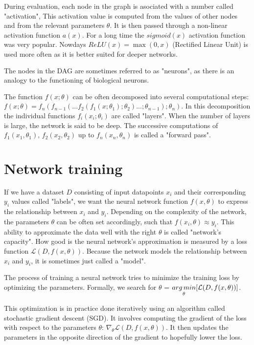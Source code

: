 During evaluation, each node in the graph is asociated with a number called "activation", This activation value is computed from the values of other nodes and from the relevant parameters $\theta$. It is then passed through a non-linear activation function $a(x)$. For a long time the $sigmoid(x)$ activation function was very popular. Nowdays $ReLU(x) = \max(0, x)$ (Rectified Linear Unit) is used more often as it is better suited for deeper networks.

The nodes in the DAG are sometimes referred to as "neurons", as there is an analogy to the functioning of biological neurons.

The function $f(x;\theta)$ can be often decomposed into several computational steps: $f(x;\theta) = f_n(f_{n-1}(...f_2(f_1(x; \theta_1);\theta_2)...;\theta_{n-1});\theta_n)$. In this decomposition the individual functions $f_i(x_i; \theta_i)$ are called "layers". When the number of layers is large, the network is said to be deep. The successive computations of $f_1(x_1, \theta_1)$, $f_2(x_2, \theta_2)$ up to $f_n(x_n, \theta_n)$ is called a "forward pass".

\section{Network training}
If we have a dataset $D$ consisting of input datapoints $x_i$ and their corresponding $y_i$ values called "labels", we want the neural network function $f(x, \theta)$ to express the relationship between $x_i$ and $y_i$. Depending on the complexity of the network, the parameters $\theta$ can be often set accordingly, such that $f(x_i, \theta) \approx y_i$. This ability to approximate the data well with the right $\theta$ is called "network's capacity". How good is the neural network's approximation is measured by a loss function $\mathcal{L}(D, f(x, \theta))$. Because the network models the relationship between $x_i$ and $y_i$, it is sometimes just called a "model".

The process of training a neural network tries to minimize the training loss by optimizing the parameters. Formally, we search for $\theta$ = $\underset{\theta}{arg\,min}[ \mathcal{L}(D, f(x, \theta))]$.

This optimization is in practice done iteratively using an algorithm called stochastic gradient descent (SGD). It involves computing the gradient of the loss with respect to the parameters $\theta$: $\nabla_{\theta} \mathcal{L}(D, f(x, \theta))$. It then updates the parameters in the opposite direction of the gradient to hopefully lower the loss.

